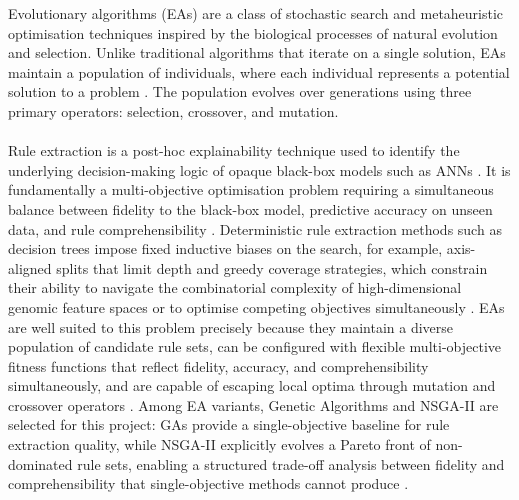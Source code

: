 Evolutionary algorithms (EAs) are a class of stochastic search and metaheuristic optimisation techniques 
inspired by the biological processes of natural evolution and selection. Unlike traditional algorithms that 
iterate on a single solution, EAs maintain a population of individuals, where each individual represents a 
potential solution to a problem \cite{Yedjour2024}. The population evolves over generations using three 
primary operators: selection, crossover, and mutation.  
\\\\
Rule extraction is a post-hoc explainability technique used to identify the underlying decision-making logic of 
opaque black-box models such as ANNs \cite{Yedjour2024,Ghasemi2024}. It is fundamentally a 
multi-objective optimisation problem requiring a simultaneous balance between fidelity to the black-box model, 
predictive accuracy on unseen data, and rule comprehensibility \cite{Yedjour2024}. Deterministic rule 
extraction methods such as decision trees impose fixed inductive biases on the search, for example, 
axis-aligned splits that limit depth and greedy coverage strategies, which constrain their ability to navigate 
the combinatorial complexity of high-dimensional genomic feature spaces or to optimise competing objectives 
simultaneously \cite{Arrieta2020, Yedjour2024}. EAs are well suited to this problem precisely 
because they maintain a diverse population of candidate rule sets, can be configured with flexible 
multi-objective fitness functions that reflect fidelity, accuracy, and comprehensibility simultaneously, and 
are capable of escaping local optima through mutation and crossover operators \cite{Yedjour2024}. Among EA 
variants, Genetic Algorithms and NSGA-II are selected for this project: GAs provide a single-objective baseline 
for rule extraction quality, while NSGA-II explicitly evolves a Pareto front of non-dominated rule sets, 
enabling a structured trade-off analysis between fidelity and comprehensibility that single-objective methods 
cannot produce \cite{Yedjour2024}. 
